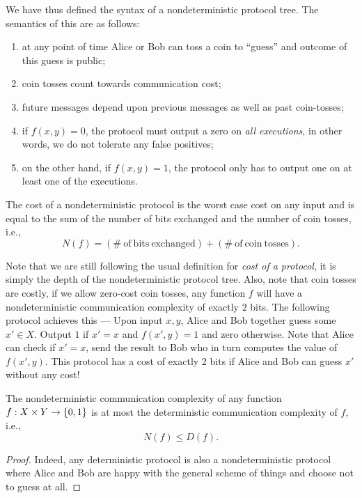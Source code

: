 \documentclass[letterpaper]{article}
\providecommand\cbrac[1]{\ensuremath \left\{#1\right\}}
\newcommand{\X}{X}
\newcommand{\Y}{Y}
\newcommand{\df}{D(f)}
\newcommand{\nf}{N(f)}
\begin{document}
We have thus defined the syntax of a nondeterministic protocol tree. The semantics of this are as follows:
\begin{enumerate}
    \item at any point of time Alice or Bob can toss a coin to ``guess'' and outcome of this guess is public;
    \item coin tosses count towards communication cost;
    \item future messages depend upon previous messages as well as past coin-tosses;
    \item if $f(x, y) = 0$, the protocol must output a zero on \emph{all executions}, in other words, we do not tolerate any false positives;
    \item on the other hand, if $f(x, y) = 1$, the protocol only has to output one on at least one of the executions.
\end{enumerate}

\begin{definition}
\label{def:nondet_cost}
The cost of a nondeterministic protocol is the worst case cost on any input and is equal to the sum of the number of bits exchanged and the number of coin tosses, i.e.,
$$
\nf = (\mathrm{\#\ of\ bits\ exchanged}) + (\mathrm{\#\ of\ coin\ tosses}).
$$
\end{definition}
\begin{remark}
Note that we are still following the usual definition for \emph{cost of a protocol}, it is simply the depth of the nondeterministic protocol tree. Also, note that coin tosses are costly, if we allow zero-cost coin tosses, any function $f$ will have a nondeterministic communication complexity of exactly $2$ bits. The following protocol achieves this --- Upon input $x, y$, Alice and Bob together guess some $x' \in \X$. Output $1$ if $x' = x$ and $f(x', y) = 1$ and zero otherwise. Note that Alice can check if $x' = x$, send the result to Bob who in turn computes the value of $f(x', y)$. This protocol has a cost of exactly 2 bits if Alice and Bob can guess $x'$ without any cost!
\end{remark}

\begin{proposition}
The nondeterministic communication complexity of any function $f : \X \times \Y \to \cbrac{0,1}$ is at most the deterministic communication complexity of $f$, i.e.,
$$
\nf \leq \df.
$$
\end{proposition}
\begin{proof}
Indeed, any deterministic protocol is also a nondeterministic protocol where Alice and Bob are happy with the general scheme of things and choose not to guess at all.
\end{proof}
\end{document}
